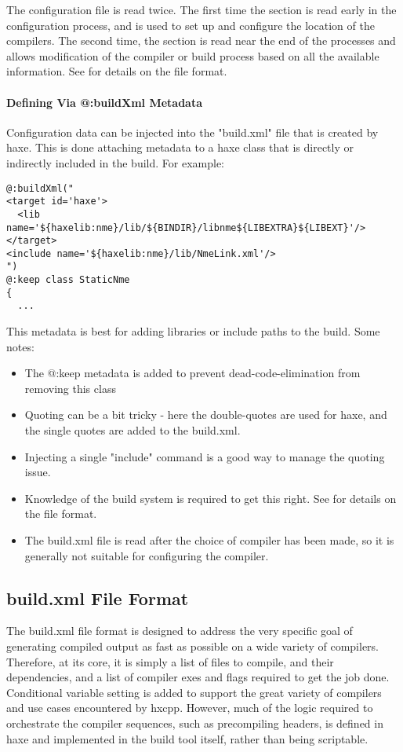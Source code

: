 The configuration file is read twice.  The first time the  section is read early in the configuration process, and is used to set up and configure the location of the compilers.  The second time, the  section is read near the end of the processes and allows modification of the compiler or build process based on all the available information.  See  for details on the file format.

\paragraph{Defining Via @:buildXml Metadata}
Configuration data can be injected into the "build.xml" file that is created by haxe.  This is done attaching metadata to a haxe class that is directly or indirectly included in the build.  For example:
\begin{lstlisting}
@:buildXml("
<target id='haxe'>
  <lib name='${haxelib:nme}/lib/${BINDIR}/libnme${LIBEXTRA}${LIBEXT}'/>
</target>
<include name='${haxelib:nme}/lib/NmeLink.xml'/>
")
@:keep class StaticNme
{
  ...
\end{lstlisting}

This metadata is best for adding libraries or include paths to the build.
Some notes:
\begin{itemize}
	\item The @:keep metadata is added to prevent dead-code-elimination from removing this class
	\item Quoting can be a bit tricky - here the double-quotes are used for haxe, and the single quotes are added to the build.xml.
	\item Injecting a single "include" command is a good way to manage the quoting issue.
	\item Knowledge of the build system is required to get this right. See  for details on the file format.
	\item The build.xml file is read after the choice of compiler has been made, so it is generally not suitable for configuring the compiler.
\end{itemize}


\subsection{build.xml File Format}
\label{target-cpp-file-format}
The build.xml file format is designed to address the very specific goal of generating compiled output as fast as possible on a wide variety of compilers.  Therefore, at its core, it is simply a list of files to compile, and their dependencies, and a list of compiler exes and flags required to get the job done.  Conditional variable setting is added to support the great variety of compilers and use cases encountered by hxcpp.  However, much of the logic required to orchestrate the compiler sequences, such as precompiling headers, is defined in haxe and implemented in the build tool itself, rather than being scriptable.

